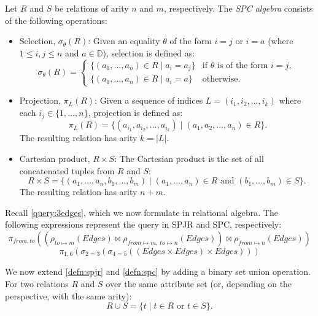 \documentclass[oneside, 11pt]{amsbook}
\theoremstyle{plain}
\theoremstyle{definition}
\theoremstyle{remark}
\begin{document}
\begin{defn}
    \label{defn:spc}
    Let $R$ and $S$ be relations of arity $n$ and $m$, respectively. The \emph{SPC algebra} consists of the following operations:
    \begin{itemize}
        \item Selection, $\sigma_\theta(R)$: Given an equality $\theta$ of the form $i = j$ or $i = a$ (where $1 \le i, j \le n$ and $a \in \mathbb{D}$), selection is defined as:
              \[
                  \sigma_\theta(R) =
                  \begin{cases}
                      \{ (a_1, \dots, a_n) \in R \mid a_i = a_j \} & \text{if } \theta \text{ is of the form } i=j, \\
                      \{ (a_1, \dots, a_n) \in R \mid a_i = a \}   & \text{otherwise.}
                  \end{cases}
              \]
        \item Projection, $\pi_L(R)$: Given a sequence of indices $L = (i_1, i_2, \dots, i_k)$ where each $i_j \in \{1, \dots, n\}$, projection is defined as:
              \[ \
                  \pi_L(R) = \{ (a_{i_1}, a_{i_2}, \dots, a_{i_k}) \mid (a_1, a_2, \dots, a_n) \in R \}.
              \]
              The resulting relation has arity $k = |L|$.
        \item Cartesian product, $R \times S$: The Cartesian product is the set of all concatenated tuples from $R$ and $S$:
              \[
                  R \times S = \{ (a_1, \dots, a_n, b_1, \dots, b_m) \mid (a_1, \dots, a_n) \in R \text{ and } (b_1, \dots, b_m) \in S \}.
              \]
              The resulting relation has arity $n + m$.
    \end{itemize}
\end{defn}

\begin{exmpl}
    Recall \autoref{query:3edges}, which we now formulate in relational algebra. The following expressions represent the query in SPJR and SPC, respectively:
    \[
        \pi_{from,to} ((\rho_{to \mapsto m}(Edges) \bowtie \rho_{from \mapsto m,\ to \mapsto n}(Edges)) \bowtie \rho_{from \mapsto n}(Edges))
    \]
    \[
        \pi_{1,6} (\sigma_{2=3} ( \sigma_{4=5} ((Edges \times Edges) \times Edges)))
    \]
\end{exmpl}

We now extend \autoref{defn:spjr} and \autoref{defn:spc} by adding a binary set union operation. For two relations $R$ and $S$ over the same attribute set (or, depending on the perspective, with the same arity):
\[
    R \cup S = \{ t \mid t \in R \text{ or } t \in S \}.
\]
\end{document}
